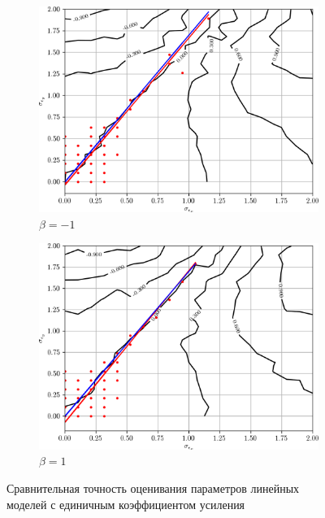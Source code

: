 \begin{figure}[p]
  \begin{subfigure}[b]{\linewidth}
    \centering
    \includegraphics[width=135mm]{fig/linear/param/beta--1_param-accs-approx}
    \caption{\( \beta = -1 \)}\label{fig:comparison_linear_params_beta--1}
  \end{subfigure}

  \vspace{2\baselineskip}
  \begin{subfigure}[b]{\linewidth}
    \centering
    \includegraphics[width=135mm]{fig/linear/param/beta-1_param-accs-approx}
    \caption{\( \beta = 1 \)}\label{fig:comparison_linear_params_beta-1}
  \end{subfigure}

  \vspace{\baselineskip}
  \caption{%
    Сравнительная точность оценивания параметров линейных \\
    моделей с единичным коэффициентом усиления
  }\label{fig:comparison_linear_params_beta-one}
\end{figure}

